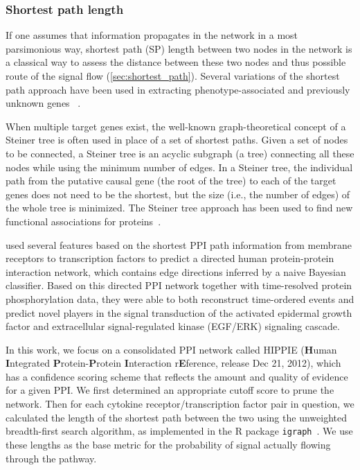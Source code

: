 \subsubsection{Shortest path length}
If one assumes that information propagates in the network in 
a most parsimonious way,
shortest path (SP) length between two nodes in the network is a classical way to
assess the distance between these two nodes and thus possible route of the signal flow
(\ref{sec:shortest_path}). Several variations of the 
shortest path approach have been used in extracting 
phenotype-associated and previously unknown genes~%
\citep{Zhou2002,Managbanag2008}.

When multiple target genes exist, the well-known graph-theoretical concept of a Steiner tree is often used in place of a set of shortest paths. Given a set of nodes to be connected, a Steiner tree is an acyclic subgraph (a tree) connecting all these nodes while using the minimum number of edges. In a Steiner tree, the individual path from the putative causal gene (the root of the tree) to each of the target genes does not need to be the shortest, but the size (i.e., the number of edges) of the whole tree is minimized. The Steiner tree approach has been used to find new functional associations for proteins~\citep{Huang2009,Bailly-Bechet2011}.

\cite{Vinayagam2011} used several features based on the shortest PPI path 
information from membrane receptors to transcription factors to
predict a directed human protein-protein interaction 
network, which contains edge directions
inferred by a naive Bayesian classifier.
Based on this directed PPI network together with 
time-resolved protein phosphorylation data,
they were able to both reconstruct time-ordered events and
predict novel players in the signal transduction of the activated epidermal growth factor and extracellular signal-regulated kinase (EGF/ERK) signaling cascade.

In this work, we focus on a consolidated PPI network called HIPPIE 
(\textbf{H}uman \textbf{I}ntegrated \textbf{P}rotein-\textbf{P}rotein 
\textbf{I}nteraction r\textbf{E}ference, release Dec 21, 2012), 
which has a confidence scoring 
scheme that reflects the amount and quality of evidence for a given PPI. 
We first determined an appropriate cutoff score to prune the network.
Then for each cytokine receptor/transcription factor pair in question,
we calculated the length of the shortest path between the two
using the unweighted breadth-first search algorithm,
as implemented in the R package \texttt{igraph}~\citep{Csardi2006}.
We use these lengths as the base metric for the probability 
of signal actually flowing through the pathway.

